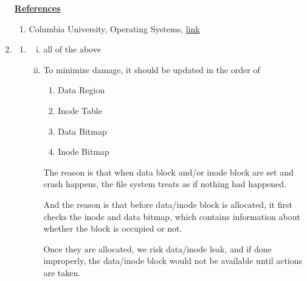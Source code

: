 \documentclass[12pt]{article}
\begin{document}
\begin{enumerate}[1.]
\begin{itemize}
    \end{itemize}

    \bigskip

    \underline{\textbf{References}}

    \begin{enumerate}[1)]
        \item Columbia University, Operating Systems, \href{https://www.cs.columbia.edu/~junfeng/10sp-w4118/lectures/l25-fs.pdf}{link}
    \end{enumerate}

    \item

    \bigskip

    \begin{enumerate}[1)]
        \item

        \begin{enumerate}[i)]
            \item all of the above
            \item

            To minimize damage, it should be updated in the order of

            \bigskip

            \begin{enumerate}[1.]
                \item Data Region
                \item Inode Table
                \item Data Bitmap
                \item Inode Bitmap
            \end{enumerate}

            \bigskip

            The reason is that when data block and/or inode block are set and
            crash happens, the file system treats as if nothing had happened.

            \bigskip

            And the reason is that before data/inode block is allocated, it first checks
            the inode and data bitmap, which contains information about whether the block is occupied or not.

            \bigskip

            Once they are allocated, we risk data/inode leak, and if done improperly,
            the data/inode block would not be available until actions are taken.
        \end{enumerate}


\end{enumerate}
\end{enumerate}
\end{document}
